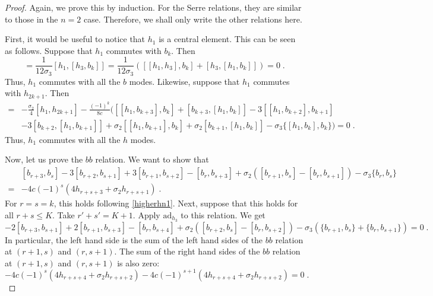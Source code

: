 \documentclass[11pt]{article}
\numberwithin{equation}{section}
\numberwithin{figure}{section}
\numberwithin{table}{section}
\begin{document}
\begin{proof}
	Again, we prove this by induction. For the Serre relations, they are similar to those in the $n=2$ case. Therefore, we shall only write the other relations here.

	First, it would be useful to notice that $h_1$ is a central element. This can be seen as follows. Suppose that $h_1$ commutes with $b_k$. Then
	\begin{equation}
		[h_1,b_{k+1}]=\frac{1}{12\sigma_3}[h_1,[h_3,b_k]]=\frac{1}{12\sigma_3}\left([[h_1,h_3],b_k]+[h_3,[h_1,b_k]]\right)=0\;.
	\end{equation}
	Thus, $h_1$ commutes with all the $b$ modes. Likewise, suppose that $h_1$ commutes with $h_{2k+1}$. Then
	\begin{align}
		[h_1,h_{2k+3}]=&-\frac{\sigma_2}{4}[h_1,h_{2k+1}]-\frac{(-1)^k}{8c}([[h_1,b_{k+3}],b_k]+[b_{k+3},[h_1,b_k]]-3[[h_1,b_{k+2}],b_{k+1}]\nonumber\\
		&-3[b_{k+2},[h_1,b_{k+1}]]+\sigma_2[[h_1,b_{k+1}],b_k]+\sigma_2[b_{k+1},[h_1,b_k]]-\sigma_3\{[h_1,b_k],b_k\})=0\;.
	\end{align}
	Thus, $h_1$ commutes with all the $h$ modes.

	Now, let us prove the $bb$ relation. We want to show that
	\begin{align}
		&[b_{r+3},b_s]-3[b_{r+2},b_{s+1}]+3[b_{r+1},b_{s+2}]-[b_r,b_{s+3}]+\sigma_2\left([b_{r+1},b_s]-[b_r,b_{s+1}]\right)-\sigma_3\{b_r,b_s\}\nonumber\\
		=&-4c(-1)^s\left(4h_{r+s+3}+\sigma_2h_{r+s+1}\right)\;.
	\end{align}
	For $r=s=k$, this holds following \eqref{higherhn1}. Next, suppose that this holds for all $r+s\leq K$. Take $r'+s'=K+1$. Apply $\mathrm{ad}_{h_3}$ to this relation. We get
	\begin{equation}
	    [b_{r+4},b_s]-2[b_{r+3},b_{s+1}]+2[b_{r+1},b_{s+3}]-[b_r,b_{s+4}]+\sigma_2\left([b_{r+2},b_s]-[b_r,b_{s+2}]\right)-\sigma_3\left(\{b_{r+1},b_s\}+\{b_r,b_{s+1}\}\right)=0\;.\label{bb+bb}
	\end{equation}
	In particular, the left hand side is the sum of the left hand sides of the $bb$ relation at $(r+1,s)$ and $(r,s+1)$. The sum of the right hand sides of the $bb$ relation at $(r+1,s)$ and $(r,s+1)$ is also zero:
	\begin{equation}
		-4c(-1)^s\left(4h_{r+s+4}+\sigma_2h_{r+s+2}\right)-4c(-1)^{s+1}\left(4h_{r+s+4}+\sigma_2h_{r+s+2}\right)=0\;.
	\end{equation}


\end{proof}
\end{document}
